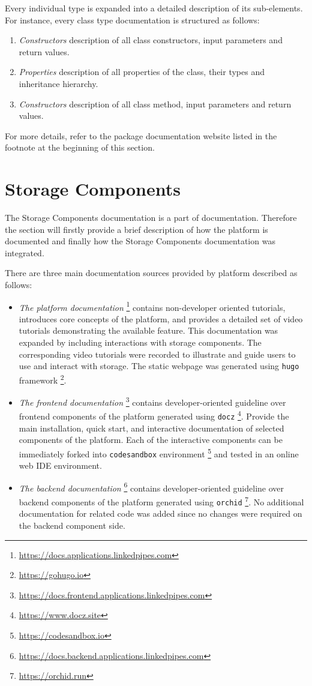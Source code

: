 Every individual type is expanded into a detailed description of its sub-elements. For instance, every class type documentation is structured as follows:
\begin{enumerate}
    \item \textit{Constructors} description of all class constructors, input parameters and return values.
    \item \textit{Properties} description of all properties of the class, their types and inheritance hierarchy.
    \item \textit{Constructors} description of all class method, input parameters and return values.
\end{enumerate}

For more details, refer to the package documentation website listed in the footnote at the beginning of this section.

\section{Storage Components}

The Storage Components documentation is a part of \lpa{} documentation. Therefore the section will firstly provide a brief description of how the \lpa{} platform is documented and finally how the Storage Components documentation was integrated.

There are three main documentation sources provided by \lpa{} platform described as follows:
\begin{itemize}
    \item \textit{The platform documentation} \footnote{\url{https://docs.applications.linkedpipes.com}} contains non-developer oriented tutorials, introduces core concepts of the platform, and provides a detailed set of video tutorials demonstrating the available feature. This documentation was expanded by including interactions with storage components. The corresponding video tutorials were recorded to illustrate and guide users to use and interact with storage. The static webpage was generated using \texttt{hugo} framework \footnote{\url{https://gohugo.io}}.
    \item \textit{The frontend documentation} \footnote{\url{https://docs.frontend.applications.linkedpipes.com}} contains developer-oriented guideline over frontend components of the platform generated using \texttt{docz} \footnote{\url{https://www.docz.site}}. Provide the main installation, quick start, and interactive documentation of selected components of the platform. Each of the interactive components can be immediately forked into \texttt{codesandbox} environment \footnote{\url{https://codesandbox.io}} and tested in an online web IDE environment. 
    \item \textit{The backend documentation} \footnote{\url{https://docs.backend.applications.linkedpipes.com}} contains developer-oriented guideline over backend components of the platform generated using \texttt{orchid} \footnote{\url{https://orchid.run}}. No additional documentation for \lpas{} related code was added since no changes were required on the backend component side.
\end{itemize}

